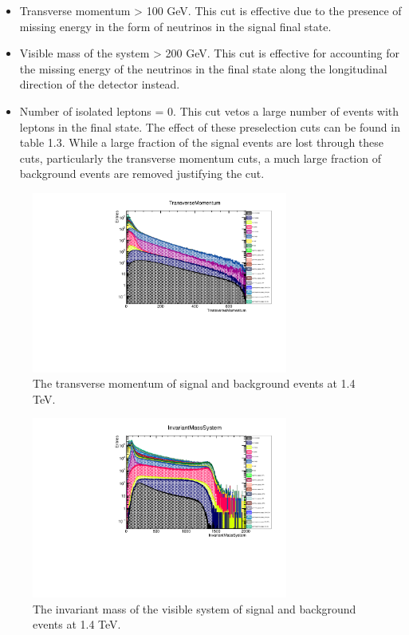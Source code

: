 \begin{itemize}
\item Transverse momentum > 100 GeV. This cut is effective due to the presence of missing energy in the form of neutrinos in the signal final state.
\item Visible mass of the system > 200 GeV. This cut is effective for accounting for the missing energy of the neutrinos in the final state along the longitudinal direction of the detector instead.
\item Number of isolated leptons = 0. This cut vetos a large number of events with leptons in the final state.
The effect of these preselection cuts can be found in table 1.3. While a large fraction of the signal events are lost through these cuts, particularly the transverse momentum cuts, a much large fraction of background events are removed justifying the cut.
\end{itemize}

\begin{figure}
\centering
\includegraphics[width=0.75\textwidth]{PhysicsAnalysis/Plots/PreSelection/Pt.pdf}
\caption[Transverse momentum at 1.4 TeV.]{The transverse momentum of signal and background events at 1.4 TeV.}
\label{fig:preselection1}
\end{figure}

\begin{figure}
\centering
\includegraphics[width=0.75\textwidth]{PhysicsAnalysis/Plots/PreSelection/InvariantMassSystem.pdf}
\caption[Invariant mass of the visible system at 1.4 TeV.]{The invariant mass of the visible system of signal and background events at 1.4 TeV.}
\label{fig:preselection2}
\end{figure}

